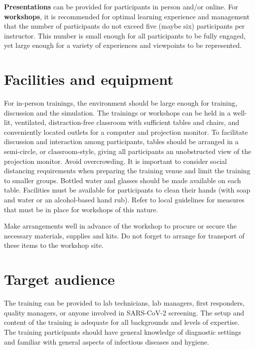 \documentclass[
]{book}
\begin{document}
\textbf{Presentations} can be provided for participants in person and/or
online. For \textbf{workshops}, it is recommended for optimal learning
experience and management that the number of participants do not exceed
five (maybe six) participants per instructor. This number is small
enough for all participants to be fully engaged, yet large enough for a
variety of experiences and viewpoints to be represented.

\hypertarget{facs}{%
\section{Facilities and equipment}\label{facs}}

For in-person trainings, the environment should be large enough for
training, discussion and the simulation. The trainings or workshops can
be held in a well-lit, ventilated, distraction-free classroom with
sufficient tables and chairs, and conveniently located outlets for a
computer and projection monitor. To facilitate discussion and
interaction among participants, tables should be arranged in a
semi-circle, or classroom-style, giving all participants an unobstructed
view of the projection monitor. Avoid overcrowding. It is important to
consider social distancing requirements when preparing the training
venue and limit the training to smaller groups. Bottled water and
glasses should be made available on each table. Facilities must be
available for participants to clean their hands (with soap and water or
an alcohol-based hand rub). Refer to local guidelines for measures that
must be in place for workshops of this nature.

Make arrangements well in advance of the workshop to procure or secure
the necessary materials, supplies and kits. Do not forget to arrange for
transport of these items to the workshop site.

\hypertarget{target}{%
\section{Target audience}\label{target}}

The training can be provided to lab technicians, lab managers, first
responders, quality managers, or anyone involved in SARS-CoV-2
screening. The setup and content of the training is adequate for all
backgrounds and levels of expertise. The training participants should
have general knowledge of diagnostic settings and familiar with general
aspects of infectious diseases and hygiene.
\end{document}
